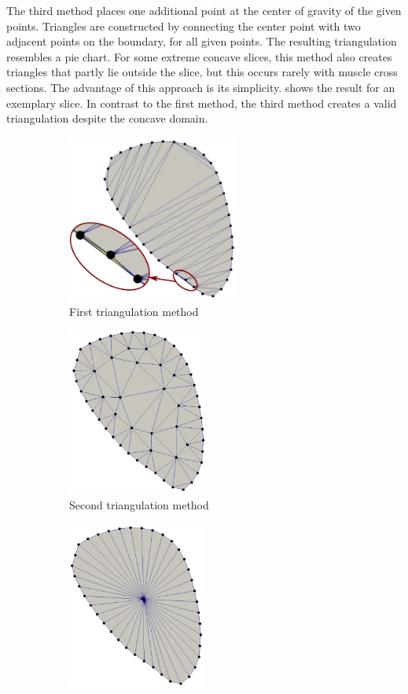 The third method places one additional point at the center of gravity of the given points. Triangles are constructed by connecting the center point with two adjacent points on the boundary, for all given points. The resulting triangulation resembles a pie chart. For some extreme concave slices, this method also creates triangles that partly lie outside the slice, but this occurs rarely with muscle cross sections. The advantage of this approach is its simplicity.
 shows the result for an exemplary slice. In contrast to the first method, the third method creates a valid triangulation despite the concave domain.

\begin{figure}%
  \centering%
  \begin{subfigure}[t]{0.31\textwidth}%
    \centering%
    \includegraphics[height=55mm]{images/fiber_creation/triangulation_0.pdf}%
    \caption{First triangulation method}%
    \label{fig:triangulation_0}%
  \end{subfigure}
  \qquad
  \begin{subfigure}[t]{0.27\textwidth}%
    \centering%
    \includegraphics[height=55mm]{images/fiber_creation/triangulation_1.png}%
    \caption{Second trian\-gulation method}%
    \label{fig:triangulation_1}%
  \end{subfigure}
  \quad
  \begin{subfigure}[t]{0.32\textwidth}%
    \centering%
    \includegraphics[height=55mm]{images/fiber_creation/triangulation_2.png}%

\end{subfigure}
\end{figure}
